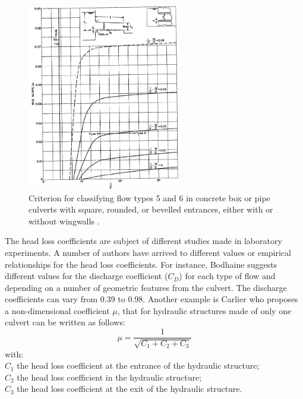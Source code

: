 \begin{figure}[H]
\begin{center}
  \includegraphics[width=0.6\textwidth]{graphics/culvert_fig4.png}
\end{center}
\caption{Criterion for classifying flow types 5 and 6 in concrete box or pipe culverts
with square, rounded, or bevelled entrances, either with or without wingwalls \cite{Bodhaine1968}.}
\label{fig:culvert_fig4}
\end{figure}

The head loss coefficients are subject of different studies made in laboratory experiments.
A number of authors have arrived to different values or empirical relationships for the
head loss coefficients. For instance, Bodhaine \cite{Bodhaine1968} suggests different values for
the discharge coefficient ($C_D$) for each type of flow and depending on a number of
geometric features from the culvert. The discharge coefficients can vary from 0.39 to 0.98.
Another example is Carlier \cite{Carlier1972} who proposes a non-dimensional coefficient $\mu$,
that for hydraulic structures made of only one culvert can be written as follows:
\begin{equation}
\mu = \dfrac{1}{\sqrt{C_1+C_2+C_3}}
\end{equation}
with:\\
$C_1$ the head loss coefficient at the entrance of the hydraulic structure;\\
$C_2$ the head loss coefficient in the hydraulic structure;\\
$C_3$ the head loss coefficient at the exit of the hydraulic structure.

